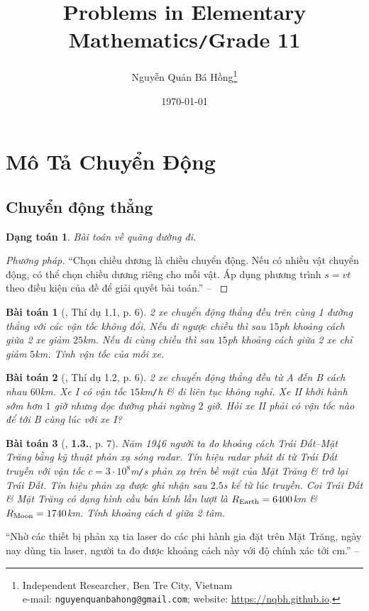 \documentclass{article}
\title{Problems in Elementary Mathematics\texttt{/}Grade 11}
\author{Nguyễn Quản Bá Hồng\footnote{Independent Researcher, Ben Tre City, Vietnam\\e-mail: \texttt{nguyenquanbahong@gmail.com}; website: \url{https://nqbh.github.io}.}}
\date{\today}
\numberwithin{equation}{section}
\newtheorem{dangtoan}{Dạng toán}[section]
\newtheorem{baitoan}{Bài toán}[section]
\begin{document}
\maketitle
\begin{abstract}
	
\end{abstract}
\tableofcontents
\newpage


\section{Mô Tả Chuyển Động}

\subsection{Chuyển động thẳng}

\begin{dangtoan}
	Bài toán về quãng đường đi.
\end{dangtoan}

\begin{proof}[Phương pháp]
	``Chọn chiều dương là chiều chuyển động. Nếu có nhiều vật chuyển động, có thể chọn chiều dương riêng cho mỗi vật. Áp dụng phương trình $s = vt$ theo điều kiện của đề để giải quyết bài toán.'' -- \cite[p. 5]{Giai_Toan_Vat_Ly_10_tap_1}
\end{proof}

\begin{baitoan}[\cite{Giai_Toan_Vat_Ly_10_tap_1}, Thí dụ 1.1, p. 6]
	2 xe chuyển động thẳng đều trên cùng 1 đường thẳng với các vận tốc không đổi. Nếu đi ngược chiều thì sau $15$\emph{ph} khoảng cách giữa 2 xe giảm $25$\emph{km}. Nếu đi cùng chiều thì sau $15$\emph{ph} khoảng cách giữa 2 xe chỉ giảm $5$\emph{km}. Tính vận tốc của mỗi xe.
\end{baitoan}

\begin{baitoan}[\cite{Giai_Toan_Vat_Ly_10_tap_1}, Thí dụ 1.2, p. 6]
	2 xe chuyển động thẳng đều từ A đến B cách nhau $60$\emph{km}. Xe I có vận tốc $15$\emph{km\texttt{/}h} \& đi liên tục không nghỉ. Xe II khởi hành sớm hơn $1$ giờ nhưng dọc đường phải ngừng $2$ giờ. Hỏi xe II phải có vận tốc nào để tới B cùng lúc với xe I?
\end{baitoan}

\begin{baitoan}[\cite{Giai_Toan_Vat_Ly_10_tap_1}, \textbf{1.3.}, p. 7]
	Năm 1946 người ta đo khoảng cách Trái Đất--Mặt Trăng bằng kỹ thuật phản xạ sóng radar. Tín hiệu radar phát đi từ Trái Đất truyền với vận tốc $c = 3\cdot 10^8$\emph{m\texttt{/}s} phản xạ trên bề mặt của Mặt Trăng \& trở lại Trái Đất. Tín hiệu phản xạ được ghi nhận sau $2.5$\emph{s} kể từ lúc truyền. Coi Trái Đất \& Mặt Trăng có dạng hình cầu bán kính lần lượt là $R_{\rm Earth} = 6400$\emph{km} \& $R_{\rm Moon} = 1740$\emph{km}. Tính khoảng cách $d$ giữa 2 tâm.
\end{baitoan}
``Nhờ các thiết bị phản xạ tia laser do các phi hành gia đặt trên Mặt Trăng, ngày nay dùng tia laser, người ta đo được khoảng cách này với độ chính xác tới cm.'' -- \cite[p. 7]{Giai_Toan_Vat_Ly_10_tap_1}
\end{document}
